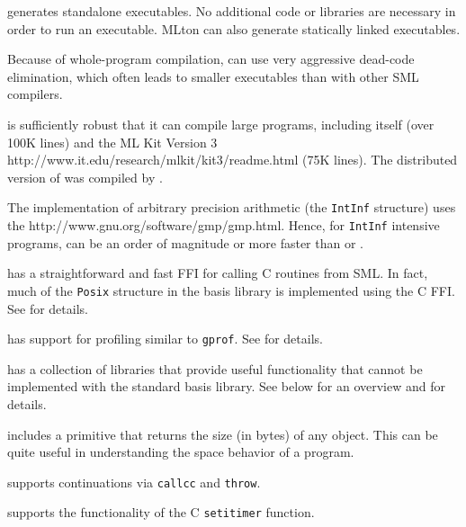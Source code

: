 \begin{description}
{\mlton} generates standalone executables.  No additional code or
libraries are necessary in order to run an executable.  MLton can also generate
statically linked executables.

Because of whole-program compilation, {\mlton} can use very aggressive 
dead-code elimination, which often leads to smaller executables than
with other SML compilers.

{\mlton} is sufficiently robust that it can compile large programs,
including itself (over 100K lines) and the
\htmladdnormallink
  {ML Kit Version 3}
  {http://www.it.edu/research/mlkit/kit3/readme.html}
(75K lines).
The distributed version of {\mlton} was compiled by {\mlton}.

The {\mlton} implementation of arbitrary precision arithmetic (the
{\tt IntInf} structure) uses the
		  {http://www.gnu.org/software/gmp/gmp.html}.
Hence, for {\tt IntInf} intensive programs, {\mlton} can be an order
of magnitude or more faster than {\poly} or {\smlnj}.

{\mlton} has a straightforward and fast FFI for calling C routines
from SML.  In fact, much of the {\tt Posix} structure in the basis library is
implemented using the C FFI.
See  for details.

{\mlton} has support for profiling similar to {\tt gprof}.  See
 for details.

{\mlton} has a collection of libraries that provide useful functionality that
cannot be implemented with the standard basis library.  See below for an
overview and  for details.

\begin{description}

{\mlton} includes a primitive that returns the size (in bytes) of any
object.  This can be quite useful in understanding the space behavior
of a program.

{\mlton} supports continuations via {\tt callcc} and {\tt throw}.

{\mlton} supports the functionality of the C {\tt setitimer} function.


\end{description}
\end{description}

